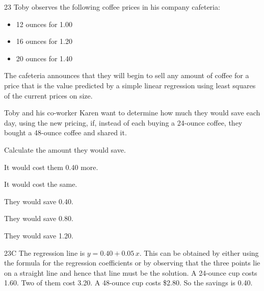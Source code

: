 \begin{question}{23}
Toby observes the following coffee prices in his company cafeteria:
\begin{itemize}
\item 12 ounces for 1.00
\item 16 ounces for 1.20
\item 20 ounces for 1.40
\end{itemize}
The cafeteria announces that they will begin to sell any amount of coffee for a price that is the value predicted by a simple linear regression using least squares of the current prices on size.

Toby and his co-worker Karen want to determine how much they would save each day, using the new pricing, if, instead of each buying a 24-ounce coffee, they bought a 48-ounce coffee and shared it.

Calculate the amount they would save.

\begin{choices}
\item It would cost them 0.40 more.
\item It would cost the same.
\item They would save 0.40.
\item They would save 0.80.
\item They would save 1.20.
\end{choices}
\end{question}
\begin{solution}{23}{C}
The regression line is $y = 0.40 + 0.05\,x$. This can be obtained by either using the formula for the regression coefficients or by observing that the three points lie on a straight line and hence that line must be the solution. A 24-ounce cup costs 1.60. Two of them cost 3.20. A 48-ounce cup costs \$2.80. So the savings is 0.40.
\end{solution}

